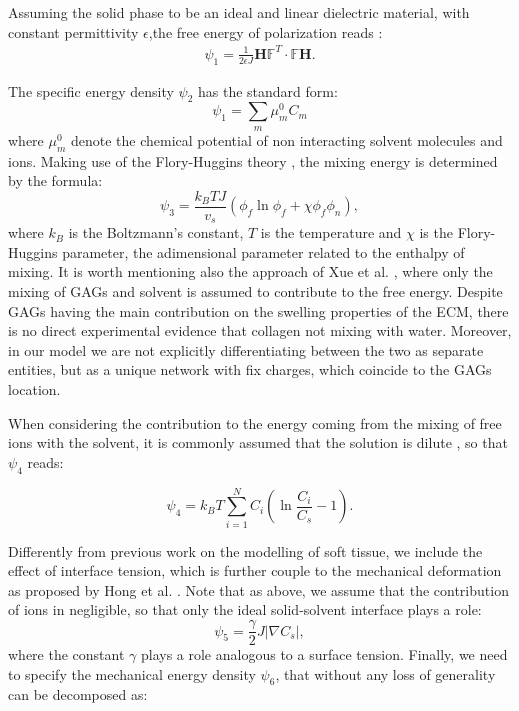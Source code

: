 \documentclass[runningheads]{llncs}
\newcommand{\F}{\ensuremath{\mathbb{F}}}
\begin{document}
Assuming the solid phase to be an ideal and linear dielectric material, with constant permittivity $\epsilon$,the free energy of polarization reads \cite{DROZDOV+,Reviewpolyel}:
\begin{gather}
\psi_1 = \frac{1}{2\epsilon J} \mathbf{H}\F^T \cdot \F \mathbf{H}.
\end{gather}

The specific energy density $\psi_2$ has the standard form:
\begin{equation}
\psi_1 = \sum\limits_{m} \mu^0_m C_m
\end{equation} 
where $\mu^0_m$ denote the chemical potential of non interacting solvent molecules and ions. Making use of the Flory-Huggins theory \cite{flory,hug}, the mixing energy is determined by the formula:
\begin{equation}
\psi_3 = \frac{k_B T J}{v_s} \left(\phi_f \ln \phi_f + \chi \phi_f \phi_n\right),
\end{equation}
where $k_B$ is the Boltzmann's constant, $T$ is the temperature and $\chi$ is the Flory-Huggins parameter, the adimensional parameter related to the enthalpy of mixing. It is worth mentioning also the approach of Xue et al. \cite{ecm1,ecm2}, where only the mixing of GAGs and solvent is assumed to contribute to the free energy. Despite GAGs having the main contribution on the swelling properties of the ECM, there is no direct experimental evidence that collagen not mixing with water. Moreover, in our model we are not explicitly differentiating between the two as separate entities, but as a unique network with fix charges, which coincide to the GAGs location.

When considering the contribution to the energy coming from the mixing of free ions with the solvent, it is commonly assumed that the solution is dilute \cite{Reviewpolyel,ecm1,ecm2}, so that $\psi_4$ reads:

\begin{equation}
\psi_4 = k_B T \sum\limits_{i=1}^{N} C_i \left(\ln \frac{C_i}{ C_s}-1\right).
\end{equation}

Differently from previous work on the modelling of soft tissue, we include the effect of interface tension, which is further couple to the mechanical deformation as proposed by Hong et al. \cite{Interface}. Note that as above, we assume that the contribution of ions in negligible, so that only the ideal solid-solvent interface plays a role:
\begin{equation}
\psi_5 = \frac{\gamma}{2} J \left|\nabla C_s\right|,
\end{equation}
where the constant $\gamma$ plays a role analogous to a surface tension.
Finally, we need to specify the mechanical energy density $\psi_6$, that without any loss of generality can be decomposed as:
\end{document}
